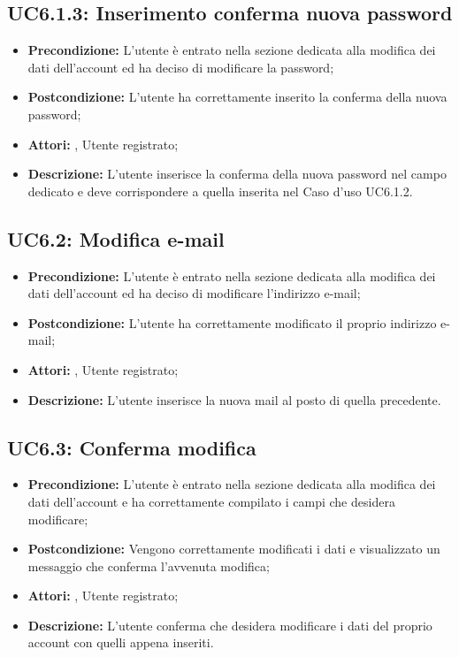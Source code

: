 \subsection{ UC6.1.3: Inserimento conferma nuova password}

\begin{itemize}
	\item \textbf{Precondizione:} L’utente è entrato nella sezione dedicata alla modifica dei dati dell’account ed ha deciso di modificare la password;
	\item \textbf{Postcondizione:} L’utente ha correttamente inserito la conferma della nuova password;
	\item \textbf{Attori:} , Utente registrato;
	\item \textbf{Descrizione:} L’utente inserisce la conferma della nuova password nel campo dedicato e deve corrispondere a quella inserita nel Caso d’uso UC6.1.2.
\end{itemize}
\subsection{ UC6.2: Modifica e-mail}

\begin{itemize}
	\item \textbf{Precondizione:} L’utente è entrato nella sezione dedicata alla modifica dei dati dell’account ed ha deciso di modificare l’indirizzo e-mail;
	\item \textbf{Postcondizione:} L’utente ha correttamente modificato il proprio indirizzo e-mail;
	\item \textbf{Attori:} , Utente registrato;
	\item \textbf{Descrizione:} L’utente inserisce la nuova mail al posto di quella precedente.
\end{itemize}
\subsection{ UC6.3: Conferma modifica}

\begin{itemize}
	\item \textbf{Precondizione:} L’utente è entrato nella sezione dedicata alla modifica dei dati dell’account e ha correttamente compilato i campi che desidera modificare;
	\item \textbf{Postcondizione:} Vengono correttamente modificati i dati e visualizzato un messaggio che conferma l’avvenuta modifica;
	\item \textbf{Attori:} , Utente registrato;
	\item \textbf{Descrizione:} L’utente conferma che desidera modificare i dati del proprio account con quelli appena inseriti.
\end{itemize}
